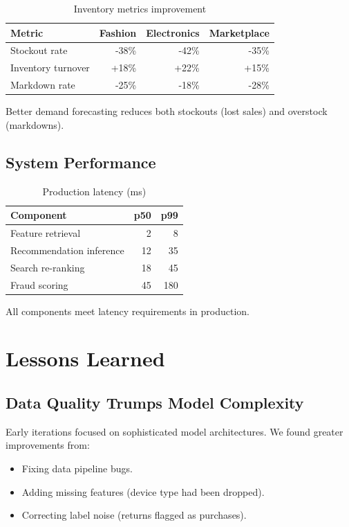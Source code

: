\documentclass[11pt,twocolumn]{article}
\begin{document}
\begin{table}[h]
\centering
\caption{Inventory metrics improvement}
\label{tab:inventory}
\begin{tabular}{lrrr}
\hline
Metric & Fashion & Electronics & Marketplace \\
\hline
Stockout rate & -38\% & -42\% & -35\% \\
Inventory turnover & +18\% & +22\% & +15\% \\
Markdown rate & -25\% & -18\% & -28\% \\
\hline
\end{tabular}
\end{table}

Better demand forecasting reduces both stockouts (lost sales) and overstock (markdowns).

\subsection{System Performance}

\begin{table}[h]
\centering
\caption{Production latency (ms)}
\label{tab:prod_latency}
\begin{tabular}{lrr}
\hline
Component & p50 & p99 \\
\hline
Feature retrieval & 2 & 8 \\
Recommendation inference & 12 & 35 \\
Search re-ranking & 18 & 45 \\
Fraud scoring & 45 & 180 \\
\hline
\end{tabular}
\end{table}

All components meet latency requirements in production.

\section{Lessons Learned}

\subsection{Data Quality Trumps Model Complexity}

Early iterations focused on sophisticated model architectures. We found greater improvements from:
\begin{itemize}
\item Fixing data pipeline bugs.
\item Adding missing features (device type had been dropped).
\item Correcting label noise (returns flagged as purchases).
\end{itemize}
\end{document}

